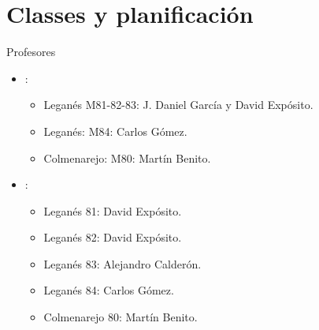 \section{Classes y planificación}

\begin{frame}[t]{Profesores}
\begin{itemize}
  \item {}: 
    \begin{itemize}
      \item Leganés M81-82-83: J. Daniel García y David Expósito.
      \item Leganés: M84: Carlos Gómez.
      \item Colmenarejo: M80: Martín Benito.
    \end{itemize}
  \item {}: 
    \begin{itemize}
      \item Leganés 81: David Expósito.
      \item Leganés 82: David Expósito.
      \item Leganés 83: Alejandro Calderón.
      \item Leganés 84: Carlos Gómez.
      \item Colmenarejo 80: Martín Benito.
    \end{itemize}
\end{itemize}
\end{frame}


